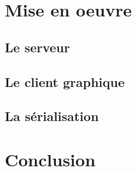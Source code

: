 \documentclass[a4paper, 12pt]{article}
\begin{document}
\section{Mise en oeuvre}
	\subsection{Le serveur}
	
	\subsection{Le client graphique}

	\subsection{La sérialisation}


\section*{Conclusion}
\end{document}

